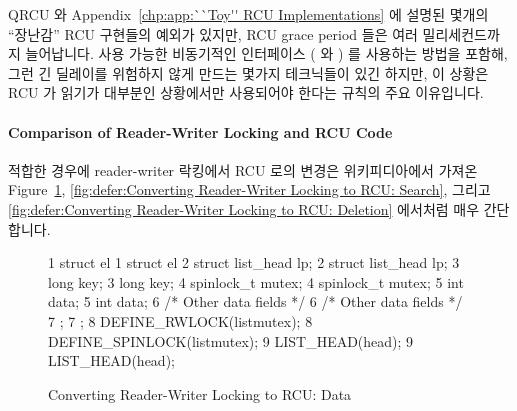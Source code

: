 QRCU 와
Appendix~\ref{chp:app:``Toy'' RCU Implementations} 에 설명된 몇개의 ``장난감''
RCU 구현들의 예외가 있지만, RCU grace period 들은 여러 밀리세컨드까지
늘어납니다.
사용 가능한 비동기적인 인터페이스 ( 와 ) 를
사용하는 방법을 포함해, 그런 긴 딜레이를 위험하지 않게 만드는 몇가지 테크닉들이
있긴 하지만, 이 상황은 RCU 가 읽기가 대부분인 상황에서만 사용되어야 한다는
규칙의 주요 이유입니다.

\paragraph{Comparison of Reader-Writer Locking and RCU Code}

적합한 경우에 reader-writer 락킹에서 RCU 로의 변경은
위키피디아에서 가져온~\cite{WikipediaRCU}
Figure~\ref{fig:defer:Converting Reader-Writer Locking to RCU: Data},
\ref{fig:defer:Converting Reader-Writer Locking to RCU: Search},
그리고
\ref{fig:defer:Converting Reader-Writer Locking to RCU: Deletion}
에서처럼 매우 간단합니다.

\begin{figure}[htbp]
{ \scriptsize
\begin{verbbox}
 1 struct el {                           1 struct el {
 2   struct list_head lp;                2   struct list_head lp;
 3   long key;                           3   long key;
 4   spinlock_t mutex;                   4   spinlock_t mutex;
 5   int data;                           5   int data;
 6   /* Other data fields */             6   /* Other data fields */
 7 };                                    7 };
 8 DEFINE_RWLOCK(listmutex);             8 DEFINE_SPINLOCK(listmutex);
 9 LIST_HEAD(head);                      9 LIST_HEAD(head);
\end{verbbox}
}
\hspace*{0.9in}\OneColumnHSpace{-0.5in}
\theverbbox
\caption{Converting Reader-Writer Locking to RCU: Data}
\label{fig:defer:Converting Reader-Writer Locking to RCU: Data}
\end{figure}

